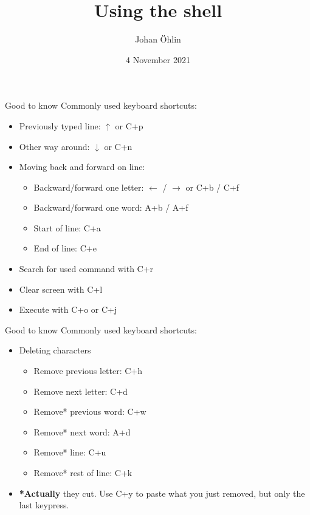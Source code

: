 \documentclass{beamer}
\title{Using the shell}
\date{4 November 2021}
\author{Johan Öhlin}
\institute{Yabs}
\let\bf\textbf
\begin{document}
\maketitle

\begin{frame}{Good to know}
        Commonly used keyboard shortcuts: \\
        \begin{itemize}
                \item Previously typed line: $\uparrow$ or C+p
                \item Other way around: $\downarrow$ or C+n
                \item Moving back and forward on line:
                        \begin{itemize}
                                \item Backward/forward one letter: $\leftarrow$ / $\rightarrow$ or C+b / C+f
                                \item Backward/forward one word: A+b / A+f
                                \item Start of line: C+a
                                \item End of line: C+e
                        \end{itemize}
                \item Search for used command with C+r
                \item Clear screen with C+l
                \item Execute with C+o or C+j
        \end{itemize}
\end{frame}

\begin{frame}{Good to know}
        Commonly used keyboard shortcuts: \\
        \begin{itemize}
                \item Deleting characters
                        \begin{itemize}
                                \item Remove previous letter: C+h
                                \item Remove next letter: C+d
                                \item Remove* previous word: C+w
                                \item Remove* next word: A+d
                                \item Remove* line: C+u
                                \item Remove* rest of line: C+k
                        \end{itemize}
                \item \bf{*Actually} they cut. Use C+y to paste what you just removed, but only the last keypress.
        \end{itemize}
\end{frame}
\end{document}
